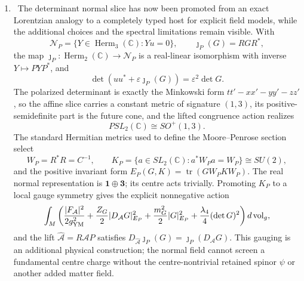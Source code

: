 \begin{enumerate}[leftmargin=1.8em]
\[ ((x,p)\sim(x+sp,p))\cong_{\rm symp}T^*\mathcal H^+_{m_0,c},
\]
so the rank-two system is exactly the future-timelike spinless particle.  For
\(m_0=0\), the intrinsic punctured rank-one reduction is
\(T^*\mathcal N_+^\times\), but the composite multiplier action is irregular:
\[
 d(\det\circ p_\alpha)_Z=0\quad
 (\operatorname{rank}_{\mathbb C}Z\leq1),
\]
so \(\dot x=\lambda p\) does not imply \(\lambda=e\); four transverse real
rank-opening directions are first-order null without being colour gauge, and
at \(Z=0\) every \(x(\tau)\) is stationary.  On the hard
\((\lambda_0,\omega_0)\)-constraint with \(\omega_0\ne0\), the momentum map
has rank four at \(w\ne0\) and rank three at \(w=0\).  Thus its own action
forces \(\dot x=0\) above the sharp threshold and permits
\(\dot x\in\mathbb Rp\) only at the threshold.  Its determinant inequality
and multiplication/Fock spectrum are exact, but the latter is not the
Hamiltonian of that action and gives a constraint-selected free spectral gap,
not a dynamically generated interacting gap.  See
\cref{hlob:thm:split-observation,hlob:thm:block-coordinates,%
 hlob:thm:lorentz-action,hlob:thm:cone-section,hlob:cor:Y3-block-form,%
 hlob:thm:colour-momentum,wpr:thm:massive,wpr:thm:massless,%
 wpr:thm:zero,wpr:thm:packet-action}.

\item \Verified\ The determinant normal slice has now been promoted from an
exact Lorentzian analogy to a completely typed host for explicit field
models, while the additional choices and the spectral limitations remain
visible.  With
\[
 \mathcal N_P=\{Y\in\operatorname{Herm}_3(\mathbb C):Yu=0\},\qquad
 \jmath_P(G)=RGR^*,
\]
the map \(\jmath_P:\operatorname{Herm}_2(\mathbb C)\to\mathcal N_P\) is a
real-linear isomorphism with inverse \(Y\mapsto PYP^*\), and
\[
 \det(uu^*+\varepsilon\jmath_P(G))=\varepsilon^2\det G.
\]
The polarized determinant is exactly the Minkowski form
\(tt'-xx'-yy'-zz'\), so the affine slice carries a constant metric of
signature \((1,3)\), its positive-semidefinite part is the future cone, and
the lifted congruence action realizes
\[
 PSL_2(\mathbb C)\cong SO^+(1,3).
\]
The standard Hermitian metrics used to define the Moore--Penrose section
select
\[
 W_P=R^*R=C^{-1},\qquad
 K_P=\{a\in SL_2(\mathbb C):a^*W_Pa=W_P\}\cong SU(2),
\]
and the positive invariant form
\(E_P(G,K)=\operatorname{tr}(GW_PKW_P)\).  The real normal representation is
\(\boldsymbol1\oplus\boldsymbol3\); its centre acts trivially.  Promoting
\(K_P\) to a local gauge symmetry gives the explicit nonnegative action
\[
 \int_M\left(
 \frac{|F_{\mathcal A}|^2}{2g_{\rm YM}^2}
 +\frac{Z_G}{2}|D_{\mathcal A}G|_{E_P}^2
 +\frac{m_G^2}{2}|G|_{E_P}^2
 +\frac{\lambda_4}{4}(\det G)^2\right)d\operatorname{vol}_g,
\]
and the lift \(\widehat{\mathcal A}=R\mathcal A P\) satisfies
\(D_{\widehat{\mathcal A}}\jmath_P(G)=
\jmath_P(D_{\mathcal A}G)\).  This gauging is an additional physical
construction; the normal field cannot screen a fundamental centre charge
without the centre-nontrivial retained spinor \(\psi\) or another added
matter field.


\end{enumerate}
